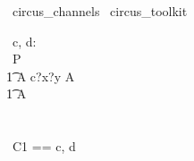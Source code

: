 

\begin{zsection}
  \SECTION\ circus\_channels \parents\ circus\_toolkit
\end{zsection}


\begin{circus}
	\circchannel\ c, d: \nat \cross \nat
	\\
	\circprocess\ P \circdef \circbegin \\
		\t1 A \circdef c?x?y \then A \\ 
		\t1 \circspot A \\
	\circend 
	\\

	\\
	\circchannelset\ C1 == \lchanset c, d \rchanset
	
\end{circus}